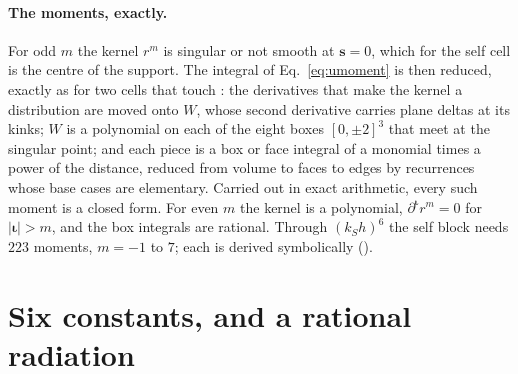 \documentclass[11pt,a4paper]{article}
\newcommand{\bs}{\mathbf{s}}
\newcommand{\biota}{\boldsymbol{\iota}}
\begin{document}
\paragraph{The moments, exactly.}\label{sec:moments} For odd $m$ the kernel $r^m$ is singular or not smooth
at $\bs=0$, which for the self cell is the centre of the support. The integral of Eq.~\eqref{eq:umoment}
is then reduced, exactly as for two cells that touch \citep{NestorCoupling2026}: the derivatives that make
the kernel a distribution are moved onto $W$, whose second derivative carries plane deltas at its kinks;
$W$ is a polynomial on each of the eight boxes $[0,\pm2]^3$ that meet at the singular point; and each
piece is a box or face integral of a monomial times a power of the distance, reduced from volume to faces to
edges by recurrences whose base cases are elementary. Carried out in exact arithmetic, every such moment is
a closed form. For even $m$ the kernel is a polynomial, $\partial^{\biota}r^m=0$ for $|\biota|>m$, and the
box integrals are rational. Through $(k_Sh)^6$ the self block needs $223$ moments, $m=-1$ to $7$; each is
derived symbolically ().

\section{Six constants, and a rational radiation}\label{sec:constants}
\end{document}
